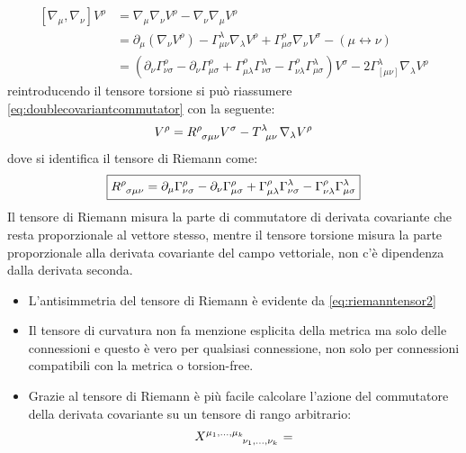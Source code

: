 \documentclass[twoside]{article}
\begin{document}
\begin{align}\label{eq:doublecovariantcommutator}
	[\nabla_\mu , \nabla_\nu]V^\rho & = \nabla_\mu \nabla_\nu V^\rho - \nabla_\nu \nabla_\mu V^\rho \\ \nonumber
	&= \partial_\mu(\nabla_\nu V^\rho) - \Gamma^{\lambda}_{\mu \nu}\nabla_{\lambda}V^{\rho} + \Gamma^{\rho}_{\mu \sigma}\nabla_\nu V^\sigma - (\mu \leftrightarrow \nu) \\ \nonumber
	&= (\partial_\nu\Gamma^{\rho}_{\nu\sigma} -\partial_\nu\Gamma^{\rho}_{\mu \sigma} 
	+ \Gamma^{\rho}_{\mu \lambda}\Gamma^{\lambda}_{\nu \sigma} - \Gamma^{\rho}_{\nu \lambda}\Gamma^{\lambda}_{\mu \sigma} )V^\sigma - 2\Gamma^{\lambda}_{[\mu \nu]}\nabla_{\lambda}V^{\rho}
\end{align}
reintroducendo il tensore torsione si può riassumere \ref{eq:doublecovariantcommutator} con la seguente:
\begin{equation}
	[\nabla_\mu , \nabla_\nu ]V^\rho = R\indices{^\rho_{\sigma \mu \nu}} V^{\sigma} - T\indices{^\lambda_{\mu \nu}}\nabla_{\lambda}V^{\rho}
\end{equation}
dove si identifica il tensore di Riemann come:
\begin{equation}\label{eq:riemanntensor2}
	\boxed{
	R\indices{^\rho_\sigma_\mu_\nu} = \partial_\mu \Gamma^{\rho}_{\nu\sigma} - \partial_{\nu}\Gamma^{\rho}_{\mu \sigma} + \Gamma^{\rho}_{\mu\lambda}\Gamma^{\lambda}_{\nu\sigma}
	- \Gamma^{\rho}_{\nu\lambda}\Gamma^{\lambda}_{\mu\sigma}
	}
\end{equation}
Il tensore di Riemann misura la parte di commutatore di derivata covariante che resta proporzionale al vettore stesso, mentre il tensore torsione misura la parte proporzionale alla derivata covariante del campo vettoriale, non c'è dipendenza dalla derivata seconda.
\begin{itemize}
\item L'antisimmetria del tensore di Riemann è evidente da \ref{eq:riemanntensor2}
\item Il tensore di curvatura non fa menzione esplicita della metrica ma solo delle connessioni e questo è vero per qualsiasi connessione, non solo per connessioni compatibili con la metrica o torsion-free.
\item Grazie al tensore di Riemann è più facile calcolare l'azione del commutatore della derivata covariante su un tensore di rango arbitrario:
\begin{align}
	[\nabla_\rho, \nabla_\sigma ]X\indices{^{\mu_1,\ldots,\mu_k}_{\nu_1,\ldots,\nu_k}} &= \\
& 	
\end{align}
\end{itemize}
\end{document}
